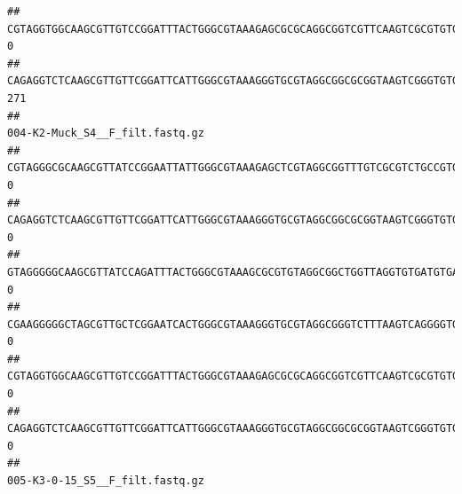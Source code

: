 \documentclass[]{article}
\begin{document}
\begin{verbatim}
## CGTAGGTGGCAAGCGTTGTCCGGATTTACTGGGCGTAAAGAGCGCGCAGGCGGTCGTTCAAGTCGCGTGTGAAAGCCCCCGGCTCAACTGGGGAGGGTCACGCGATACTGATCGACTCGAAGGCAGGAGAGGGTAGTGGAATTCCCGGTGTAGTGGTGAAATGCGTAGATATCGGGAGGAACACCAGTGGCGAAGGCGACTACCTGGCCTGTTCTTGACGCTGAGGCGCGAAAGCTAGGGGAGCAAACG                                0
## CAGAGGTCTCAAGCGTTGTTCGGATTCATTGGGCGTAAAGGGTGCGTAGGCGGCGCGGTAAGTCGGGTGTGAAATCTCGGGGCTTAACTCCGAAACTGCATTCGATACTGCCGTGCTTGAGGACTGGAGAGGAGACTGGAATTTACGGTGTAGCGGTGAAATGCGTAGATATCGTAAGGAAGACCAGTGGCGAAGGCGGGTCTCTGGACAGTTCCTGACGCTGAGGCACGAAGGCCAGGGGAGCAAACG                              271
##                                                                                                                                                                                                                                                           004-K2-Muck_S4__F_filt.fastq.gz
## CGTAGGGCGCAAGCGTTATCCGGAATTATTGGGCGTAAAGAGCTCGTAGGCGGTTTGTCGCGTCTGCCGTGAAAGTCCGGGGCTCAACTCCGGATCTGCGGTGGGTACGGGCAGACTAGAGTGATGTAGGGGAGACTGGAATTCCTGGTGTAGCGGTGAAATGCGCAGATATCAGGAGGAACACCGATGGCGAAGGCAGGTCTCTGGGCATTAACTGACGCTGAGGAGCGAAAGCATGGGGAGCGAACA                               0
## CAGAGGTCTCAAGCGTTGTTCGGATTCATTGGGCGTAAAGGGTGCGTAGGCGGCGCGGTAAGTCGGGTGTGAAATCTCGGAGCTTAACTCCGAAACTGCATTCGATACTGCCGTGCTTGAGGACTGGAGAGGAGACTGGAATTTACGGTGTAGCGGTGAAATGCGTAGATATCGTAAGGAAGACCAGTGGCGAAGGCGGGTCTCTGGACAGTTCCTGACGCTGAGGCACGAAGGCCAGGGGAGCAAACG                               0
## GTAGGGGGCAAGCGTTATCCAGATTTACTGGGCGTAAAGCGCGTGTAGGCGGCTGGTTAGGTGTGATGTGAAATCTTCCGGCTCAACCGGAAAACTGCATTGCAAACCGGCCTGGCTAGAGTGCAGGAGAGGGAAGCGGAATTCCAGGTGTAGCGGTGAAATGCGTAGATATCTGGAGGAACACCAGTGGCGAAGGCGGCTTCCTGGCCTGCAACTGACGCTGAGACGCGAAAGCGTGGGGAGCGAAC                                0
## CGAAGGGGGCTAGCGTTGCTCGGAATCACTGGGCGTAAAGGGTGCGTAGGCGGGTCTTTAAGTCAGGGGTGAAATCCTGGAGCTCAACTCCAGAACTGCCTTTGATACTGAAGATCTTGAGTTCGGGAGAGGTGAGTGGAACTGCGAGTGTAGAGGTGAAATTCGTAGATATTCGCAAGAACACCAGTGGCGAAGGCGGCTCACTGGCCCGATACTGACGCTGAGGCACGAAAGCGTGGGGAGCAAACA                               0
## CGTAGGTGGCAAGCGTTGTCCGGATTTACTGGGCGTAAAGAGCGCGCAGGCGGTCGTTCAAGTCGCGTGTGAAAGCCCCCGGCTCAACTGGGGAGGGTCACGCGATACTGATCGACTCGAAGGCAGGAGAGGGTAGTGGAATTCCCGGTGTAGTGGTGAAATGCGTAGATATCGGGAGGAACACCAGTGGCGAAGGCGACTACCTGGCCTGTTCTTGACGCTGAGGCGCGAAAGCTAGGGGAGCAAACG                               0
## CAGAGGTCTCAAGCGTTGTTCGGATTCATTGGGCGTAAAGGGTGCGTAGGCGGCGCGGTAAGTCGGGTGTGAAATCTCGGGGCTTAACTCCGAAACTGCATTCGATACTGCCGTGCTTGAGGACTGGAGAGGAGACTGGAATTTACGGTGTAGCGGTGAAATGCGTAGATATCGTAAGGAAGACCAGTGGCGAAGGCGGGTCTCTGGACAGTTCCTGACGCTGAGGCACGAAGGCCAGGGGAGCAAACG                               0
##                                                                                                                                                                                                                                                           005-K3-0-15_S5__F_filt.fastq.gz

\end{verbatim}
\end{document}
